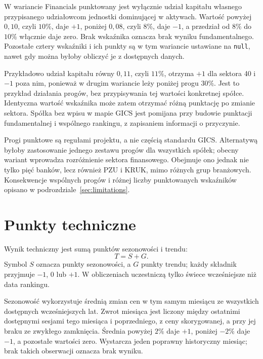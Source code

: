 \documentclass[12pt,a4paper,twoside]{report}
\begin{document}
W wariancie Financials punktowany jest wyłącznie udział kapitału własnego przypisanego udziałowcom jednostki dominującej w aktywach. Wartość powyżej $0{,}10$, czyli $10\%$, daje $+1$, poniżej $0{,}08$, czyli $8\%$, daje $-1$, a przedział od $8\%$ do $10\%$ włącznie daje zero. Brak wskaźnika oznacza brak wyniku fundamentalnego. Pozostałe cztery wskaźniki i ich punkty są w tym wariancie ustawiane na \texttt{null}, nawet gdy można byłoby obliczyć je z dostępnych danych.

Przykładowo udział kapitału równy $0{,}11$, czyli $11\%$, otrzyma $+1$ dla sektora 40 i $-1$ poza nim, ponieważ w drugim wariancie leży poniżej progu $30\%$. Jest to przykład działania progów, bez przypisywania tej wartości konkretnej spółce. Identyczna wartość wskaźnika może zatem otrzymać różną punktację po zmianie sektora. Spółka bez wpisu w mapie GICS jest pomijana przy budowie punktacji fundamentalnej i wspólnego rankingu, z zapisaniem informacji o przyczynie.

Progi punktowe są regułami projektu, a nie częścią standardu GICS. Alternatywą byłoby zastosowanie jednego zestawu progów dla wszystkich spółek; obecny wariant wprowadza rozróżnienie sektora finansowego. Obejmuje ono jednak nie tylko pięć banków, lecz również PZU i KRUK, mimo różnych grup branżowych. Konsekwencje wspólnych progów i różnej liczby punktowanych wskaźników opisano w podrozdziale~\ref{sec:limitations}.


\section{Punkty techniczne}

Wynik techniczny jest sumą punktów sezonowości i trendu:
\begin{equation}
    T=S+G.
\end{equation}
Symbol $S$ oznacza punkty sezonowości, a $G$ punkty trendu; każdy składnik przyjmuje $-1$, $0$ lub $+1$. W obliczeniach uczestniczą tylko świece wcześniejsze niż data rankingu.

Sezonowość wykorzystuje średnią zmian cen w tym samym miesiącu ze wszystkich dostępnych wcześniejszych lat. Zwrot miesiąca jest liczony między ostatnimi dostępnymi sesjami tego miesiąca i poprzedniego, z ceny skorygowanej, a przy jej braku ze zwykłego zamknięcia. Średnia powyżej $2\%$ daje $+1$, poniżej $-2\%$ daje $-1$, a pozostałe wartości zero. Wystarcza jeden poprawny historyczny miesiąc; brak takich obserwacji oznacza brak wyniku.
\end{document}
